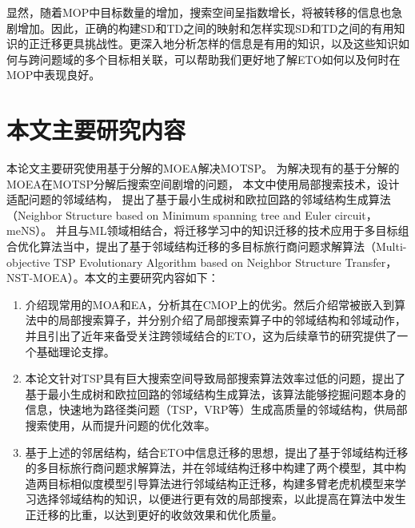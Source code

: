 \par
显然，随着MOP中目标数量的增加，搜索空间呈指数增长，将被转移的信息也急剧增加\cite{tan2021evolutionary}。因此，正确的构建SD和TD之间的映射和怎样实现SD和TD之间的有用知识的正迁移更具挑战性。更深入地分析怎样的信息是有用的知识，以及这些知识如何与跨问题域的多个目标相关联，可以帮助我们更好地了解ETO如何以及何时在MOP中表现良好。

\section{本文主要研究内容}

本论文主要研究使用基于分解的MOEA解决MOTSP。
为解决现有的基于分解的MOEA在MOTSP分解后搜索空间剧增的问题，
本文中使用局部搜索技术，设计适配问题的邻域结构，
提出了基于最小生成树和欧拉回路的邻域结构生成算法（Neighbor Structure based on Minimum spanning tree and Euler circuit，meNS）。
并且与ML领域相结合，将迁移学习中的知识迁移的技术应用于多目标组合优化算法当中，提出了基于邻域结构迁移的多目标旅行商问题求解算法（Multi-objective TSP Evolutionary Algorithm based on Neighbor Structure Transfer，NST-MOEA）。本文的主要研究内容如下：
\begin{enumerate}
    \item 介绍现常用的MOA和EA，分析其在CMOP上的优劣。然后介绍常被嵌入到算法中的局部搜索算子，并分别介绍了局部搜索算子中的邻域结构和邻域动作，并且引出了近年来备受关注跨领域结合的ETO，这为后续章节的研究提供了一个基础理论支撑。
    \item 本论文针对TSP具有巨大搜索空间导致局部搜索算法效率过低的问题，提出了基于最小生成树和欧拉回路的邻域结构生成算法，该算法能够挖掘问题本身的信息，快速地为路径类问题（TSP，VRP等）生成高质量的邻域结构，供局部搜索使用，从而提升问题的优化效率。
    \item 基于上述的邻居结构，结合ETO中信息迁移的思想，提出了基于邻域结构迁移的多目标旅行商问题求解算法，并在邻域结构迁移中构建了两个模型，其中构造两目标相似度模型引导算法进行邻域结构正迁移，构建多臂老虎机模型来学习选择邻域结构的知识，以便进行更有效的局部搜索，以此提高在算法中发生正迁移的比重，以达到更好的收敛效果和优化质量。
\end{enumerate}


